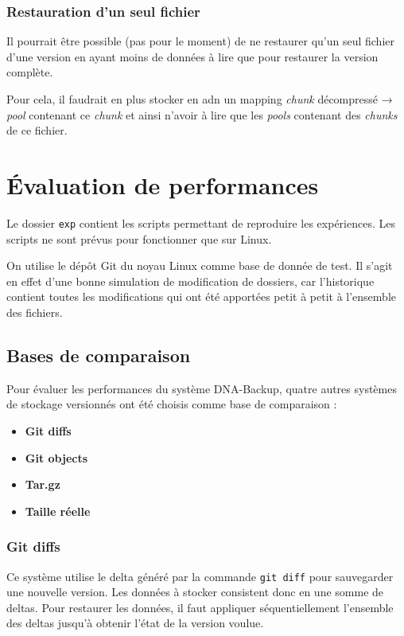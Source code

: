 \documentclass[a4paper]{report}
\begin{document}
\subsection{Restauration d'un seul
fichier}

Il pourrait être possible (pas pour le moment) de ne restaurer qu'un
seul fichier d'une version en ayant moins de données à lire que pour
restaurer la version complète.

Pour cela, il faudrait en plus stocker en \ac{adn} un mapping \emph{chunk}
décompressé → \emph{pool} contenant ce \emph{chunk} et ainsi n'avoir à
lire que les \emph{pools} contenant des \emph{chunks} de ce fichier.

\chapter{Évaluation de performances}

Le dossier \verb|exp| contient les scripts permettant de reproduire
les expériences. Les scripts ne sont prévus pour fonctionner que sur
Linux.

On utilise le dépôt Git du noyau Linux comme base de donnée de test. Il
s'agit en effet d'une bonne simulation de modification de dossiers, car
l'historique contient toutes les modifications qui ont été apportées
petit à petit à l'ensemble des fichiers.

\section{Bases de comparaison}

Pour évaluer les performances du système DNA-Backup, quatre autres
systèmes de stockage versionnés ont été choisis comme base de
comparaison :

\begin{itemize}
\item
  \textbf{Git diffs}
\item
  \textbf{Git objects}
\item
  \textbf{Tar.gz}
\item
  \textbf{Taille réelle}
\end{itemize}

\subsection{Git diffs}

Ce système utilise le delta généré par la commande \verb|git diff|
pour sauvegarder une nouvelle version. Les données à stocker consistent
donc en une somme de deltas. Pour restaurer les données, il faut
appliquer séquentiellement l'ensemble des deltas jusqu'à obtenir l'état
de la version voulue.
\end{document}
